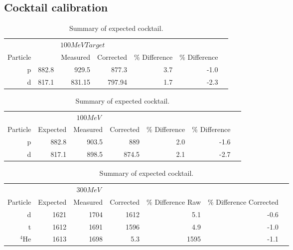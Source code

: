 \subsection{Cocktail calibration}

\begin{table*}\centering
{}
\begin{tabular}{@{}rrrrrrr@{}}\toprule
& \multicolumn{3}{c}{$100 MeV Target$}\\
\cmidrule{2-4}
Particle &\phantom{abc} & Measured & Corrected & \% Difference & \% Difference\\
\midrule
p   & 882.8 & 929.5 & 877.3   &  3.7  & -1.0  \\
d   & 817.1 & 831.15 & 797.94 &  1.7  & -2.3\\
\bottomrule
\end{tabular}
\caption{Summary of expected cocktail. }
\label{tb:cocktail100tar}
\end{table*}

\begin{table*}\centering
{}
\begin{tabular}{@{}rrrrrrr@{}}\toprule
& \multicolumn{3}{c}{$100 MeV$}\\
\cmidrule{2-4}
Particle & Expected & Measured & Corrected & \% Difference & \% Difference\\
\midrule
p   & 882.8 & 903.5 & 889   &  2.0   & -1.6  \\
d   & 817.1 & 898.5 & 874.5 &  2.1   & -2.7\\
\bottomrule
\end{tabular}
\caption{Summary of expected cocktail. }
\label{tb:cocktail100}
\end{table*}

\begin{table*}\centering
{}
\begin{tabular}{@{}rrrrrrr@{}}\toprule
& \multicolumn{3}{c}{$300 MeV$}\\
\cmidrule{2-4}
Particle & Expected & Measured & Corrected & \% Difference Raw & \% Difference Corrected\\
\midrule
d   & 1621 & 1704 & 1612   &  5.1 & -0.6  \\
t   & 1612 & 1691 & 1596   &  4.9  & -1.0\\
${}^{4}$He   & 1613 & 1698 &  5.3 & 1595  & -1.1\\

\bottomrule
\end{tabular}
\caption{Summary of expected cocktail. }
\label{tb:cocktail300}
\end{table*}



